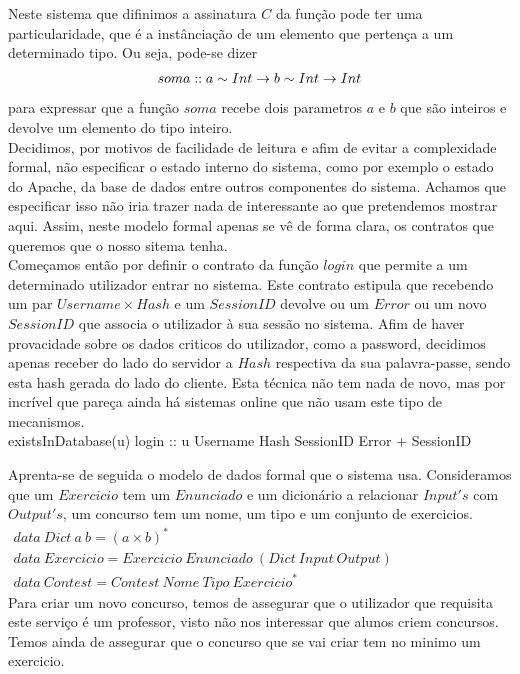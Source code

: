 Neste sistema que difinimos a assinatura $C$ da função pode ter uma particularidade, que é a instânciação de um elemento que pertença a um determinado tipo.
Ou seja, pode-se dizer $$soma :: a \sim Int \rightarrow b \sim Int \rightarrow Int$$ para expressar que a função $soma$ recebe dois parametros $a$ e $b$ que são inteiros e devolve
um elemento do tipo inteiro.\\

Decidimos, por motivos de facilidade de leitura e afim de evitar a complexidade formal, não especificar o estado interno do sistema, como por exemplo o estado do Apache,
da base de dados entre outros componentes do sistema. Achamos que especificar isso não iria trazer nada de interessante ao que pretendemos mostrar aqui.
Assim, neste modelo formal apenas se vê de forma clara, os contratos que queremos que o nosso sitema tenha.\\

Começamos então por definir o contrato da função $login$ que permite a um determinado utilizador entrar no sistema. Este contrato estipula que recebendo um par
$Username \times Hash$ e um $SessionID$ devolve ou um $Error$ ou um novo $SessionID$ que associa o utilizador à sua sessão no sistema. Afim de haver provacidade
sobre os dados criticos do utilizador, como a password, decidimos apenas receber do lado do servidor a $Hash$ respectiva da sua palavra-passe, sendo esta hash
gerada do lado do cliente. Esta técnica não tem nada de novo, mas por incrível que pareça ainda há sistemas online que não usam este tipo de mecanismos.\\

\prop
{existsInDatabase(u)}
{login :: u \unif Username \times Hash \rarrow SessionID \rarrow Error + SessionID}
{ }

Aprenta-se de seguida o modelo de dados formal que o sistema usa. Consideramos que um $Exercicio$ tem um $Enunciado$ e um dicionário a relacionar $Input's$ com $Output's$,
um concurso tem um nome, um tipo e um conjunto de exercicios.\\

$\begin{array}{l}
data~Dict~a~b = (a \times b)^{*} \\
data~Exercicio = Exercicio~Enunciado~(Dict~Input~Output) \\
data~Contest =  Contest~Nome~Tipo~Exercicio^{*}
\end{array}$\\

Para criar um novo concurso, temos de assegurar que o utilizador que requisita este serviço é um professor, visto não nos interessar que alunos criem concursos.
Temos ainda de assegurar que o concurso que se vai criar tem no minimo um exercicio.\\

